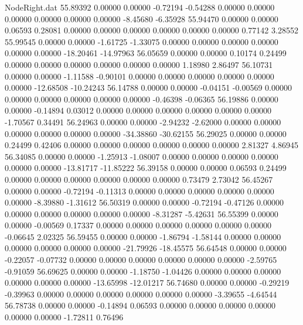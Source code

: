 \begin{filecontents}{NodeRight.dat}
  55.89392    0.00000    0.00000    -0.72194   -0.54288    0.00000    0.00000    0.00000    0.00000    0.00000    0.00000   -8.45680   -6.35928
  55.94470    0.00000    0.00000     0.06593    0.28081    0.00000    0.00000    0.00000    0.00000    0.00000    0.00000    0.77142    3.28552
  55.99545    0.00000    0.00000    -1.61725   -1.33075    0.00000    0.00000    0.00000    0.00000    0.00000    0.00000  -18.20461  -14.97963
  56.05659    0.00000    0.00000     0.10174    0.24499    0.00000    0.00000    0.00000    0.00000    0.00000    0.00000    1.18980    2.86497
  56.10731    0.00000    0.00000    -1.11588   -0.90101    0.00000    0.00000    0.00000    0.00000    0.00000    0.00000  -12.68508  -10.24243
  56.14788    0.00000    0.00000    -0.04151   -0.00569    0.00000    0.00000    0.00000    0.00000    0.00000    0.00000   -0.46398   -0.06365
  56.19886    0.00000    0.00000    -0.14894    0.03012    0.00000    0.00000    0.00000    0.00000    0.00000    0.00000   -1.70567    0.34491
  56.24963    0.00000    0.00000    -2.94232   -2.62000    0.00000    0.00000    0.00000    0.00000    0.00000    0.00000  -34.38860  -30.62155
  56.29025    0.00000    0.00000     0.24499    0.42406    0.00000    0.00000    0.00000    0.00000    0.00000    0.00000    2.81327    4.86945
  56.34085    0.00000    0.00000    -1.25913   -1.08007    0.00000    0.00000    0.00000    0.00000    0.00000    0.00000  -13.81717  -11.85222
  56.39158    0.00000    0.00000     0.06593    0.24499    0.00000    0.00000    0.00000    0.00000    0.00000    0.00000    0.73479    2.73042
  56.45267    0.00000    0.00000    -0.72194   -0.11313    0.00000    0.00000    0.00000    0.00000    0.00000    0.00000   -8.39880   -1.31612
  56.50319    0.00000    0.00000    -0.72194   -0.47126    0.00000    0.00000    0.00000    0.00000    0.00000    0.00000   -8.31287   -5.42631
  56.55399    0.00000    0.00000    -0.00569    0.17337    0.00000    0.00000    0.00000    0.00000    0.00000    0.00000   -0.06645    2.02325
  56.59455    0.00000    0.00000    -1.86794   -1.58144    0.00000    0.00000    0.00000    0.00000    0.00000    0.00000  -21.79926  -18.45575
  56.64548    0.00000    0.00000    -0.22057   -0.07732    0.00000    0.00000    0.00000    0.00000    0.00000    0.00000   -2.59765   -0.91059
  56.69625    0.00000    0.00000    -1.18750   -1.04426    0.00000    0.00000    0.00000    0.00000    0.00000    0.00000  -13.65998  -12.01217
  56.74680    0.00000    0.00000    -0.29219   -0.39963    0.00000    0.00000    0.00000    0.00000    0.00000    0.00000   -3.39655   -4.64544
  56.78738    0.00000    0.00000    -0.14894    0.06593    0.00000    0.00000    0.00000    0.00000    0.00000    0.00000   -1.72811    0.76496

\end{filecontents}
